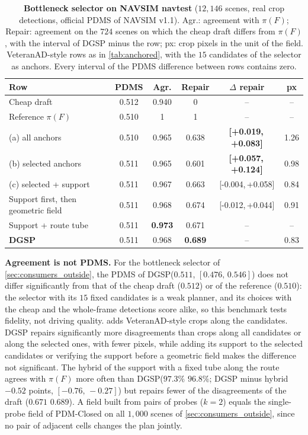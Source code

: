 \documentclass[10pt,letterpaper]{article}
\newcommand{\method}{DGSP\xspace}
\newcommand{\full}{F}
\newcommand{\policy}{\pi}
\newcommand{\ci}[2]{[#1,\allowbreak\,#2]}
\newcommand{\best}[1]{\textbf{#1}}
\newcommand{\oursrow}{\rowcolor{oursbg}}
\newcommand{\na}{--}
\theoremstyle{remark}
\theoremstyle{plain}
\theoremstyle{definition}
\begin{document}
\begin{table}[!htbp]
\centering
\caption{\textbf{Bottleneck selector on NAVSIM navtest} ($12{,}146$ scenes, real crop detections, official PDMS of NAVSIM v1.1). Agr.: agreement with $\policy(\full)$; Repair: agreement on the $724$ scenes on which the cheap draft differs from $\policy(\full)$, with the interval of \method minus the row; px: crop pixels in the unit of the field. VeteranAD-style rows as in \cref{tab:anchored}, with the $15$ candidates of the selector as anchors. Every interval of the PDMS difference between rows contains zero.}
\label{tab:navsim_k41}
\small
\setlength{\tabcolsep}{3pt}
\begin{tabular}{@{}lccccc@{}}
\toprule
Row & PDMS & Agr. & Repair & $\Delta$ repair & px \\
\midrule
Cheap draft & 0.512 & 0.940 & 0 & \na & \na \\
Reference $\policy(\full)$ & 0.510 & 1 & 1 & \na & \na \\
(a) all anchors & 0.510 & 0.965 & 0.638 & \best{\ci{+0.019}{+0.083}} & 1.26 \\
(b) selected anchors & 0.511 & 0.965 & 0.601 & \best{\ci{+0.057}{+0.124}} & 0.98 \\
(c) selected + support & 0.511 & 0.967 & 0.663 & \ci{-0.004}{+0.058} & 0.84 \\
Support first, then geometric field & 0.511 & 0.968 & 0.674 & \ci{-0.012}{+0.044} & 0.91 \\
Support + route tube & 0.511 & \textbf{0.973} & 0.671 & \na & \na \\
\midrule
\oursrow \textbf{\method} & 0.511 & 0.968 & \textbf{0.689} & \na & 0.83 \\
\bottomrule
\end{tabular}
\end{table}

\noindent\textbf{Agreement is not PDMS.}
For the bottleneck selector of \cref{sec:consumers_outside}, the PDMS of \method ($0.511$, $\ci{0.476}{0.546}$) does not differ significantly from that of the cheap draft ($0.512$) or of the reference ($0.510$): the selector with its $15$ fixed candidates is a weak planner, and its choices with the cheap and the whole-frame detections score alike, so this benchmark tests fidelity, not driving quality.
 adds VeteranAD-style crops along the candidates.
\method repairs significantly more disagreements than crops along all candidates or along the selected ones, with fewer pixels, while adding its support to the selected candidates or verifying the support before a geometric field makes the difference not significant.
The hybrid of the support with a fixed tube along the route agrees with $\policy(\full)$ more often than \method ($97.3\%$ \vs $96.8\%$; \method minus hybrid $-0.52$ points, $\ci{-0.76}{-0.27}$) but repairs fewer of the disagreements of the draft ($0.671$ \vs $0.689$).
A field built from pairs of probes ($k=2$) equals the single-probe field of PDM-Closed on all $1{,}000$ scenes of \cref{sec:consumers_outside}, since no pair of adjacent cells changes the plan jointly.
\end{document}
